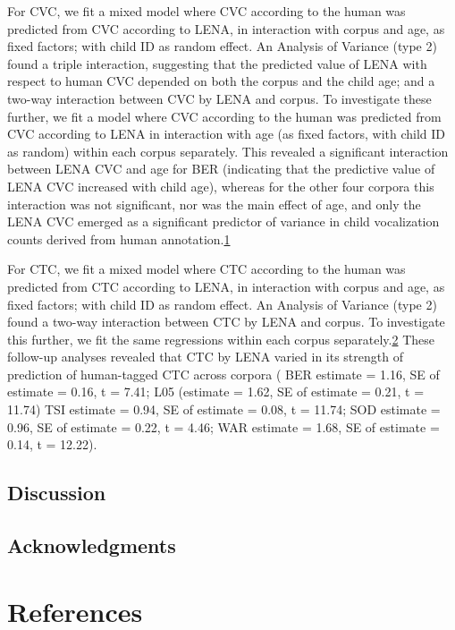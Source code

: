 \documentclass[english,floatsintext,man]{apa6}
\begin{document}
For CVC, we fit a mixed model where CVC according to the human was
predicted from CVC according to LENA, in interaction with corpus and
age, as fixed factors; with child ID as random effect. An Analysis of
Variance (type 2) found a triple interaction, suggesting that the
predicted value of LENA with respect to human CVC depended on both the
corpus and the child age; and a two-way interaction between CVC by LENA
and corpus. To investigate these further, we fit a model where CVC
according to the human was predicted from CVC according to LENA in
interaction with age (as fixed factors, with child ID as random) within
each corpus separately. This revealed a significant interaction between
LENA CVC and age for BER (indicating that the predictive value of LENA
CVC increased with child age), whereas for the other four corpora this
interaction was not significant, nor was the main effect of age, and
only the LENA CVC emerged as a significant predictor of variance in
child vocalization counts derived from human
annotation.\href{For\%20both\%20BER\%20and\%20WAR,\%20the\%20variance\%20associated\%20to\%20the\%20child\%20ID\%20random\%20factor\%20was\%20zero.\%20This\%20suggests\%20a\%20mixed\%20model\%20was\%20not\%20necessary,\%20as\%20child\%20ID\%20is\%20not\%20explaining\%20any\%20additional\%20variance,\%20but\%20it\%20does\%20not\%20alter\%20the\%20interpretation\%20in\%20the\%20main\%20text.}{1}

For CTC, we fit a mixed model where CTC according to the human was
predicted from CTC according to LENA, in interaction with corpus and
age, as fixed factors; with child ID as random effect. An Analysis of
Variance (type 2) found a two-way interaction between CTC by LENA and
corpus. To investigate this further, we fit the same regressions within
each corpus
separately.\href{For\%20both\%20TSI\%20and\%20WAR,\%20the\%20variance\%20associated\%20to\%20the\%20child\%20ID\%20random\%20factor\%20was\%20zero.\%20This\%20suggests\%20a\%20mixed\%20model\%20was\%20not\%20necessary,\%20as\%20child\%20ID\%20is\%20not\%20explaining\%20any\%20additional\%20variance,\%20but\%20it\%20does\%20not\%20alter\%20the\%20interpretation\%20in\%20the\%20main\%20text.}{2}
These follow-up analyses revealed that CTC by LENA varied in its
strength of prediction of human-tagged CTC across corpora ( BER estimate
= 1.16, SE of estimate = 0.16, t = 7.41; L05 (estimate = 1.62, SE of
estimate = 0.21, t = 11.74) TSI estimate = 0.94, SE of estimate = 0.08,
t = 11.74; SOD estimate = 0.96, SE of estimate = 0.22, t = 4.46; WAR
estimate = 1.68, SE of estimate = 0.14, t = 12.22).

\subsection{Discussion}\label{discussion}

\subsection{Acknowledgments}\label{acknowledgments}

\newpage

\section{References}\label{references}

\setlength{\parindent}{-0.5in} \setlength{\leftskip}{0.5in}
\end{document}
